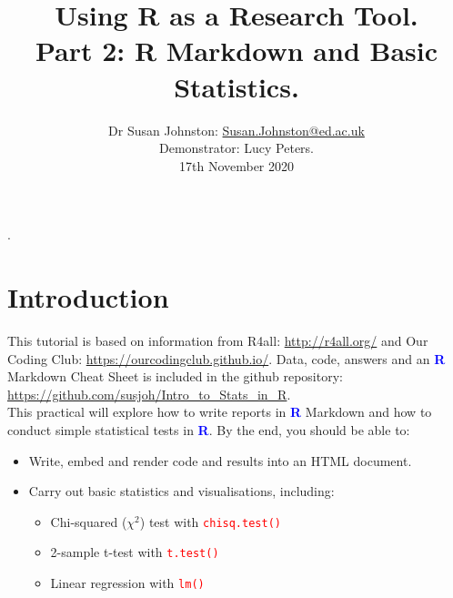 \documentclass[a4paper,12pt]{article}
\newcommand\boldblue[1]{\textcolor{blue}{\textbf{#1}}}
\newcommand\code[1]{\textcolor{red}{\texttt{#1}}}
\begin{document}





\title{Using R as a Research Tool.\\
Part 2: R Markdown and Basic Statistics.}

\author{\small{Dr Susan Johnston: \href{mailto:Susan.Johnston@ed.ac.uk}{Susan.Johnston@ed.ac.uk}}  \\
        \small{Demonstrator: Lucy Peters.} \\
        \small{17th November 2020}}
\date{}



\maketitle


\vspace*{-2.5cm}.
\section {Introduction}

This tutorial is based on information from R4all: \url{http://r4all.org/} and Our Coding Club: \url{https://ourcodingclub.github.io/}. Data, code, answers and an \boldblue{R} Markdown Cheat Sheet is included in the github repository: \url{https://github.com/susjoh/Intro_to_Stats_in_R}. \\

This practical will explore how to write reports in \boldblue{R} Markdown and how to conduct simple statistical tests in \boldblue{R}. By the end, you should be able to:

\begin{itemize}

\item Write, embed and render code and results into an HTML document.

\item Carry out basic statistics and visualisations, including:

\begin{itemize}

\item Chi-squared ($\chi^{2}$) test with \code{chisq.test()}
\item 2-sample t-test with \code{t.test()}
\item Linear regression with \code{lm()}

\end{itemize}

\end{itemize}
\end{document}
